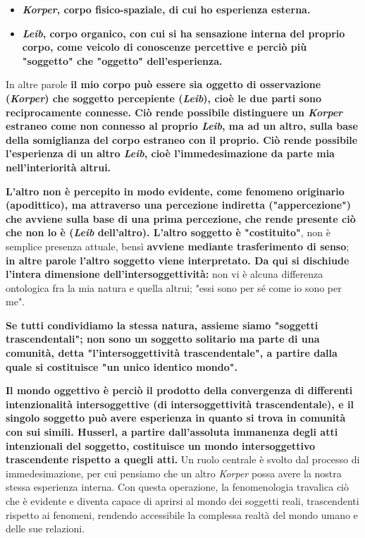 \begin{itemize}
	\item \textbf{\textit{Korper}, corpo fisico-spaziale, di cui ho
	esperienza esterna.}
	\item \textbf{\textit{Leib}, corpo organico, con cui si ha sensazione
	interna del proprio corpo, come veicolo di
	conoscenze percettive e perciò più "soggetto"
	che "oggetto" dell'esperienza.}
\end{itemize}

In altre parole \textbf{il mio corpo può essere sia oggetto
di osservazione (\textit{Korper}) che soggetto percepiente
(\textit{Leib}), cioè le due parti sono reciprocamente connesse.
Ciò rende possibile distinguere un \textit{Korper} estraneo
come non connesso al proprio \textit{Leib}, ma ad
un altro, sulla base della somiglianza del
corpo estraneo con il proprio. Ciò rende possibile
l'esperienza di un altro \textit{Leib}, cioè l'immedesimazione
da parte mia nell'interiorità altrui.}

\textbf{L'altro non è percepito in modo evidente, come
fenomeno originario (apodittico), ma attraverso
una percezione indiretta ("appercezione") che
avviene sulla base di una prima percezione, che
rende presente ciò che non lo è (\textit{Leib} dell'altro).
L'altro soggetto è "costituito"}, non è semplice
presenza attuale, bensì \textbf{avviene mediante
trasferimento di senso};\textbf{ in altre parole l'altro soggetto viene interpretato.
Da qui si dischiude l'intera dimensione dell'intersoggettività:} non vi è alcuna differenza
ontologica fra la mia natura e quella altrui;
"essi sono per sé come io sono per me".

\textbf{Se tutti condividiamo la stessa natura, assieme
siamo "soggetti trascendentali"; non sono
un soggetto solitario ma parte di una
comunità, detta "l'intersoggettività trascendentale",
a partire dalla quale si costituisce "un unico
identico mondo".}

\textbf{Il mondo oggettivo è perciò il prodotto della
convergenza di differenti intenzionalità
intersoggettive (di intersoggettività trascendentale),
e il singolo soggetto può avere esperienza in
quanto si trova in comunità con sui simili.
Husserl, a partire dall'assoluta immanenza degli atti
intenzionali del soggetto, costituisce un mondo
intersoggettivo trascendente rispetto a quegli atti.}
Un ruolo centrale è svolto dal processo di
immedesimazione, per cui pensiamo che un
altro \textit{Korper} possa avere la nostra stessa
esperienza interna. Con questa operazione, la
fenomenologia travalica ciò che è evidente
e diventa capace di aprirsi al mondo dei
soggetti reali, trascendenti rispetto ai
fenomeni, rendendo accessibile la complessa
realtà del mondo umano e delle sue relazioni.

